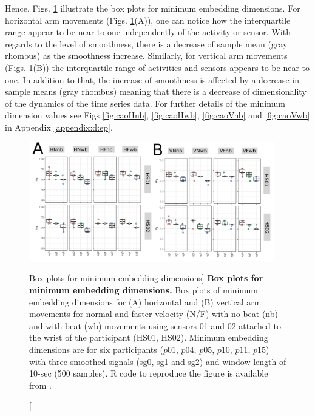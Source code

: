 Hence, Figs. \ref{fig:CAO-hii} illustrate the box plots for minimum 
embedding dimensions.
For horizontal arm movements (Figs. \ref{fig:CAO-hii}(A)), 
one can notice how the interquartile range  
appear to be near to one independently of the 
activity or sensor. 
With regards to the level of smoothness,
there is a decrease of sample mean (gray rhombus) 
as the smoothness increase.  
Similarly, for vertical arm movements (Figs. \ref{fig:CAO-hii}(B))
the interquartile range of activities and sensors 
appears to be near to one. In addition to that, 
the increase of smoothness is affected by a decrease 
in sample means (gray rhombus) meaning that there is 
a decrease of dimensionality of the dynamics of 
the time series data.
For further details of the minimum dimension values see 
Figs \ref{fig:caoHnb}, \ref{fig:caoHwb}, \ref{fig:caoVnb} and 
\ref{fig:caoVwb} in Appendix \ref{appendix:d:ep}.
\begin{figure}
\centering
\includegraphics[width=0.95\textwidth]{fig_5_03}
	\caption
	[Box plots for minimum embedding dimensions]{
	{\bf Box plots for minimum embedding dimensions.} 
		Box plots of minimum embedding dimensions for 
		(A) horizontal and (B) vertical arm movements for
		normal  and faster velocity (N/F) with no beat (nb) 
		and with beat (wb) movements
		using sensors 01 and 02 attached to the wrist of the 
		participant (HS01, HS02).
		Minimum embedding dimensions are for six participants 
		($p01$, $p04$, $p05$, $p10$, $p11$, $p15$) with three 
		smoothed signals (sg0, sg1 and sg2)
		and window length of 10-sec (500 samples).
		R code to reproduce the figure is available 
		from \cite{xochicale2018}.
        }
    \label{fig:CAO-hii}
\end{figure}

